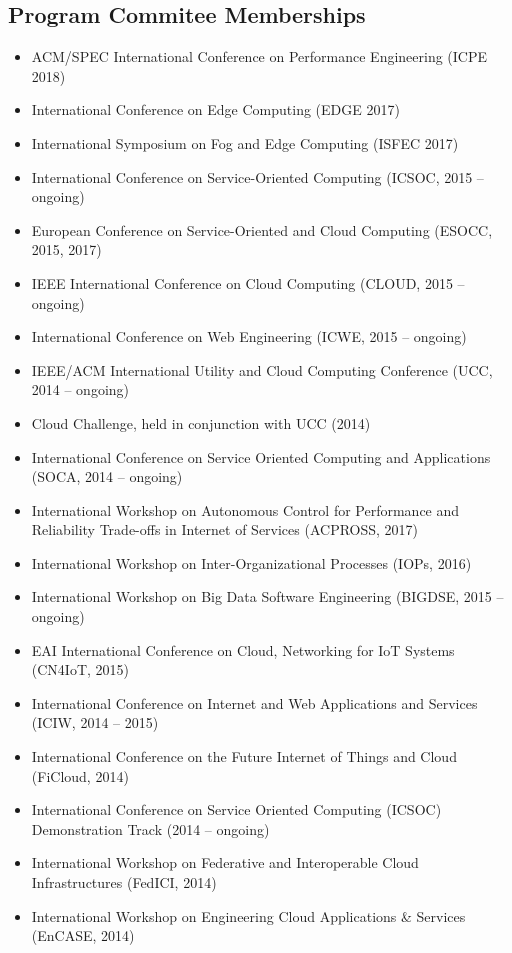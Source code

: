 \documentclass[paper=letter,fontsize=11pt]{scrartcl} %
\begin{document}
\subsection*{Program Commitee Memberships}
\begin{itemize}
	\item ACM/SPEC International Conference on Performance Engineering (ICPE 2018)
	\item International Conference on Edge Computing (EDGE 2017)
  \item International Symposium on Fog and Edge Computing (ISFEC 2017)
  \item International Conference on Service-Oriented Computing (ICSOC, 2015 -- ongoing)
  \item European Conference on Service-Oriented and Cloud Computing (ESOCC, 2015, 2017)
  \item IEEE International Conference on Cloud Computing (CLOUD, 2015 -- ongoing)
  \item International Conference on Web Engineering (ICWE, 2015 -- ongoing)
  \item IEEE/ACM International Utility and Cloud Computing Conference (UCC, 2014 -- ongoing)
    \item Cloud Challenge, held in conjunction with UCC (2014)
      \item International Conference on Service Oriented Computing and Applications (SOCA, 2014 -- ongoing)
  \item International Workshop on Autonomous Control for Performance and Reliability Trade-offs in Internet of Services (ACPROSS, 2017)
	\item International Workshop on Inter-Organizational Processes (IOPs, 2016)
    \item  International Workshop on Big Data Software Engineering (BIGDSE, 2015 -- ongoing)
  \item EAI International Conference on Cloud, Networking for IoT Systems (CN4IoT, 2015)
  \item International Conference on Internet and Web Applications and Services (ICIW, 2014 -- 2015)
  \item International Conference on the Future Internet of Things and Cloud (FiCloud, 2014)
    \item International Conference on Service Oriented Computing (ICSOC) Demonstration Track (2014 -- ongoing)
    \item International Workshop on Federative and Interoperable Cloud Infrastructures (FedICI, 2014)
    \item International Workshop on Engineering Cloud Applications \& Services (EnCASE, 2014)

\end{itemize}
\end{document}
